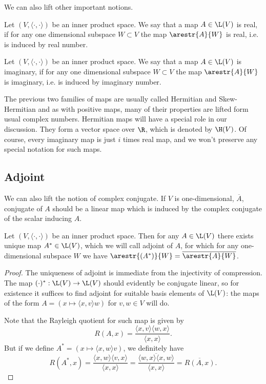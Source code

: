 We can also lift other important notions.

\begin{maar}
	Let $(V, \langle \cdot, \cdot \rangle)$ be an inner product space. We say that a map $A \in \L(V)$ is real, if for any one dimensional subspace $W \subset V$ the map $\arestr{A}{W}$ is real, i.e. is induced by real number.
\end{maar}

\begin{maar}
	Let $(V, \langle \cdot, \cdot \rangle)$ be an inner product space. We say that a map $A \in \L(V)$ is imaginary, if for any one dimensional subspace $W \subset V$ the map $\arestr{A}{W}$ is imaginary, i.e. is induced by imaginary number.
\end{maar}

The previous two families of maps are usually called Hermitian and Skew-Hermitian and as with positive maps, many of their properties are lifted form usual complex numbers. Hermitian maps will have a special role in our discussion. They form a vector space over $\R$, which is denoted by $\H(V)$. Of course, every imaginary map is just $i$ times real map, and we won't preserve any special notation for such maps.

\subsection{Adjoint}

We can also lift the notion of complex conjugate. If $V$ is one-dimensional, $\overline{A}$, conjugate of $A$ should be a linear map which is induced by the complex conjugate of the scalar inducing $A$.

\begin{lause}
	Let $(V, \langle \cdot, \cdot \rangle)$ be an inner product space. Then for any $A \in \L(V)$ there exists unique map $A^{*} \in \L(V)$, which we will call adjoint of $A$, for which for any one-dimensional subspace $W$ we have $\arestr{(A^{*})}{W} = \overline{\arestr{A}{W}}$.
\end{lause}
\begin{proof}
	The uniqueness of adjoint is immediate from the injectivity of compression. The map $(\cdot)^{*} : \L(V) \to \L(V)$ should evidently be conjugate linear, so for existence it suffices to find adjoint for suitable basis elements of $\L(V)$: the maps of the form $A = (x \mapsto \langle x, v \rangle w)$ for $v, w \in V$ will do.

	Note that the Rayleigh quotient for such map is given by
	\[
		R(A, x) = \frac{\langle x, v \rangle \langle w, x \rangle}{\langle x, x \rangle}.
	\]
	But if we define $A^{*} = (x \mapsto \langle x, w \rangle v)$, we definitely have
	\[
		R(A^{*}, x) = \frac{\langle x, w \rangle \langle v, x \rangle}{\langle x, x \rangle} = \overline{\frac{\langle w, x \rangle \langle x, w \rangle}{\langle x, x \rangle}} = \overline{R(A, x)}.
	\]
\end{proof}

